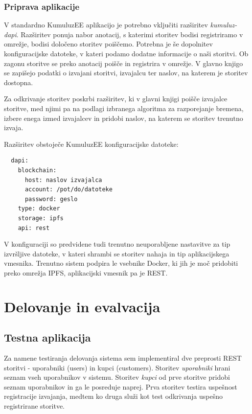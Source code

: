 \documentclass[a4paper, 12pt]{book}
\begin{document}
\subsection{Priprava aplikacije}
V standardno KumuluzEE aplikacijo je potrebno vključiti razširitev \textit{kumuluz-dapi}. 
Razširitev ponuja nabor anotacij, s katerimi storitev bodisi registriramo v omrežje, bodisi določeno storitev poiščemo.
Potrebna je še dopolnitev konfiguracijske datoteke, v kateri podamo dodatne informacije o naši storitvi.
Ob zagonu storitve se preko anotacij poišče in registrira v omrežje.
V glavno knjigo se zapišejo podatki o izvajani storitvi, izvajalcu ter naslov, na katerem je storitev dostopna.

Za odkrivanje storitev poskrbi razširitev, ki v glavni knjigi poišče izvajalce storitve, med njimi pa na podlagi izbranega algoritma za razporejanje bremena, izbere enega izmed izvajalcev in pridobi naslov, na katerem se storitev trenutno izvaja.

Razširitev obstoječe KumuluzEE konfiguracijske datoteke:
\begin{lstlisting}
  dapi:
    blockchain:
      host: naslov izvajalca
      account: /pot/do/datoteke
      password: geslo
    type: docker
    storage: ipfs
    api: rest
\end{lstlisting}

V konfiguraciji so predvidene tudi trenutno neuporabljene nastavitve za tip izvršljive datoteke, v kateri shrambi se storitev nahaja in tip aplikacijskega vmesnika.
Trenutno sistem podpira le vsebnike Docker, ki jih je moč pridobiti preko omrežja IPFS, aplikacijski vmesnik pa je REST.


\chapter{Delovanje in evalvacija}

\section{Testna aplikacija}

Za namene testiranja delovanja sistema sem implementiral dve preprosti REST storitvi - uporabniki (users) in kupci (customers).
Storitev \textit{uporabniki} hrani seznam vseh uporabnikov v sistemu.
Storitev \textit{kupci} od prve storitve pridobi seznam uporabnikov in ga le posreduje naprej.
Prva storitev testira uspešnost registracije izvajanja, medtem ko druga služi kot test odkrivanja uspešno registrirane storitve.
\end{document}
